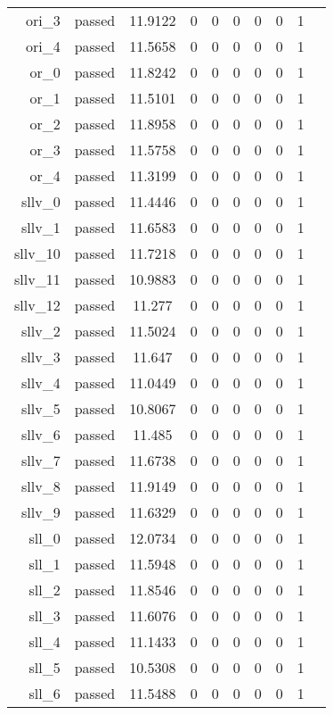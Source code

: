 \begin{longtable}{r|ccccccccc}
    ori\_3 & passed & 11.9122 & 0 & 0 & 0 & 0 & 0 & 1 \\
    ori\_4 & passed & 11.5658 & 0 & 0 & 0 & 0 & 0 & 1 \\
    or\_0 & passed & 11.8242 & 0 & 0 & 0 & 0 & 0 & 1 \\
    or\_1 & passed & 11.5101 & 0 & 0 & 0 & 0 & 0 & 1 \\
    or\_2 & passed & 11.8958 & 0 & 0 & 0 & 0 & 0 & 1 \\
    or\_3 & passed & 11.5758 & 0 & 0 & 0 & 0 & 0 & 1 \\
    or\_4 & passed & 11.3199 & 0 & 0 & 0 & 0 & 0 & 1 \\
    sllv\_0 & passed & 11.4446 & 0 & 0 & 0 & 0 & 0 & 1 \\
    sllv\_1 & passed & 11.6583 & 0 & 0 & 0 & 0 & 0 & 1 \\
    sllv\_10 & passed & 11.7218 & 0 & 0 & 0 & 0 & 0 & 1 \\
    sllv\_11 & passed & 10.9883 & 0 & 0 & 0 & 0 & 0 & 1 \\
    sllv\_12 & passed & 11.277 & 0 & 0 & 0 & 0 & 0 & 1 \\
    sllv\_2 & passed & 11.5024 & 0 & 0 & 0 & 0 & 0 & 1 \\
    sllv\_3 & passed & 11.647 & 0 & 0 & 0 & 0 & 0 & 1 \\
    sllv\_4 & passed & 11.0449 & 0 & 0 & 0 & 0 & 0 & 1 \\
    sllv\_5 & passed & 10.8067 & 0 & 0 & 0 & 0 & 0 & 1 \\
    sllv\_6 & passed & 11.485 & 0 & 0 & 0 & 0 & 0 & 1 \\
    sllv\_7 & passed & 11.6738 & 0 & 0 & 0 & 0 & 0 & 1 \\
    sllv\_8 & passed & 11.9149 & 0 & 0 & 0 & 0 & 0 & 1 \\
    sllv\_9 & passed & 11.6329 & 0 & 0 & 0 & 0 & 0 & 1 \\
    sll\_0 & passed & 12.0734 & 0 & 0 & 0 & 0 & 0 & 1 \\
    sll\_1 & passed & 11.5948 & 0 & 0 & 0 & 0 & 0 & 1 \\
    sll\_2 & passed & 11.8546 & 0 & 0 & 0 & 0 & 0 & 1 \\
    sll\_3 & passed & 11.6076 & 0 & 0 & 0 & 0 & 0 & 1 \\
    sll\_4 & passed & 11.1433 & 0 & 0 & 0 & 0 & 0 & 1 \\
    sll\_5 & passed & 10.5308 & 0 & 0 & 0 & 0 & 0 & 1 \\
    sll\_6 & passed & 11.5488 & 0 & 0 & 0 & 0 & 0 & 1 \\

\end{longtable}
